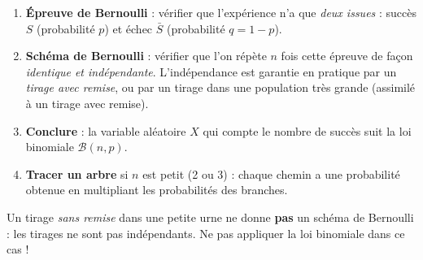 \documentclass[11pt]{article}
\newcommand{\cle}[1]{{\popxbold\color{popdark}#1}}
\begin{document}
\begin{methode}
\begin{enumerate}
\item \textbf{Épreuve de Bernoulli} : vérifier que l'expérience n'a que \emph{deux issues} : succès $S$ (probabilité $p$) et échec $\bar{S}$ (probabilité $q = 1 - p$).
\item \textbf{Schéma de Bernoulli} : vérifier que l'on répète $n$ fois cette épreuve de façon \emph{identique et indépendante}. L'indépendance est garantie en pratique par un \emph{tirage avec remise}, ou par un tirage dans une population très grande (assimilé à un tirage avec remise).
\item \textbf{Conclure} : la variable aléatoire $X$ qui compte le nombre de succès suit la \cle{loi binomiale} $\mathcal{B}(n, p)$.
\item \textbf{Tracer un arbre} si $n$ est petit (2 ou 3) : chaque chemin a une probabilité obtenue en multipliant les probabilités des branches.
\end{enumerate}
\begin{attention}
Un tirage \emph{sans remise} dans une petite urne ne donne \textbf{pas} un schéma de Bernoulli : les tirages ne sont pas indépendants. Ne pas appliquer la loi binomiale dans ce cas !
\end{attention}
\end{methode}
\end{document}
